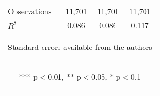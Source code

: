 \begin{center}
\begin{tabular}{lccc}
\midrule Observations & 11,701 & 11,701 & 11,701 \\
 $R^2$ & 0.086 & 0.086 & 0.117 \\ \bottomrule
\multicolumn{4}{c}{\begin{footnotesize} Standard errors available from the authors\end{footnotesize}} \\
\multicolumn{4}{c}{\begin{footnotesize} *** p$<$0.01, ** p$<$0.05, * p$<$0.1\end{footnotesize}} 
\end{tabular}
\end{center}
